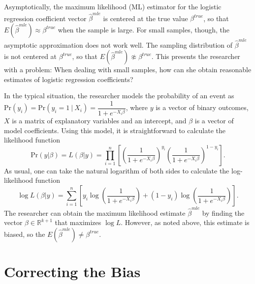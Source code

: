 \documentclass[12pt]{article}
\begin{document}
Asymptotically, the maximum likelihood (ML) estimator for the logistic regression coefficient vector $\hat{\beta}^{mle}$ is centered at the true value $\beta^{true}$, so that $E(\hat{\beta}^{mle}) \approx \beta^{true}$ when the sample is large.
For small samples, though, the asymptotic approximation does not work well. The sampling distribution of $\hat{\beta}^{mle}$ is not centered at $\beta^{true}$, so that $E(\hat{\beta}^{mle}) \not\approx \beta^{true}$. 
This presents the researcher with a problem: When dealing with small samples, how can she obtain reasonable estimates of logistic regression coefficients?

In the typical situation, the researcher models the probability of an event as $\text{Pr}(y_i) = \text{Pr}(y_i = 1~|~ X_i) = \dfrac{1}{1 + e^{-X_i\beta}}$, where $y$ is a vector of binary outcomes, $X$ is a matrix of explanatory variables and an intercept, and $\beta$ is a vector of model coefficients. 
Using this model, it is straightforward to calculate the likelihood function 
\begin{equation}\nonumber
\text{Pr}(y | \beta) = L(\beta | y) = \displaystyle \prod_{i = 1}^n \left[\left( \dfrac{1}{1 + e^{-X_i\beta}}\right)^{y_i}\left( \dfrac{1}{1 + e^{-X_i\beta}}\right)^{1 - y_i}\right]\text{.}
\end{equation}
\noindent As usual, one can take the natural logarithm of both sides to calculate the log-likelihood function 
\begin{equation}\nonumber
\log L(\beta | y) = \displaystyle \sum_{i = 1}^n \left[y_i \log \left( \dfrac{1}{1 + e^{-X_i\beta}}\right) + (1 - y_i) \log \left( \dfrac{1}{1 + e^{-X_i\beta}}\right)\right].
\end{equation}
\noindent The researcher can obtain the maximum likelihood estimate $\hat{\beta}^{mle}$ by finding the vector $\beta \in \mathbb{R}^{k + 1}$ that maximizes $\log L$. 
However, as noted above, this estimate is biased, so the $E(\hat{\beta}^{mle}) \neq \beta^{true}$.

\section*{Correcting the Bias}
\end{document}
